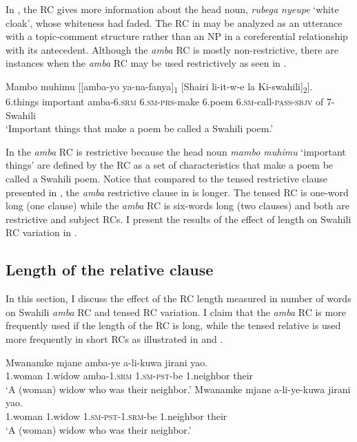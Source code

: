 \documentclass[output=paper,colorlinks,citecolor=brown]{langscibook}
\begin{document}
In , the RC gives more information about the head noun, \textit{rubega nyeupe} ‘white cloak’, whose whiteness had faded. The RC in  may be analyzed as an utterance with a topic-comment structure rather than an NP in a coreferential relationship with its antecedent. Although the \textit{amba} RC is mostly non-restrictive, there are instances when the \textit{amba} RC may be used restrictively as seen in .

\ea%
    \label{ex:mwamzandi:18}
    \gll    Mambo muhimu [[amba-yo  ya-na-fanya]\textsubscript{1} [Shairi li-it-w-e la Ki-swahili]\textsubscript{2}].\\
            6.things important amba\textsc{-6.srm} \textsc{6.sm-prs-}make 6.poem  \textsc{6.sm-}call\textsc{-pass-sbjv} of 7-Swahili\\
    \glt    ‘Important things that make a poem be called a Swahili poem.’
\z

In  the \textit{amba} RC is restrictive because the head noun \textit{mambo muhimu} ‘important things’ are defined by the RC as a set of characteristics that make a poem be called a Swahili poem. Notice that compared to the tensed restrictive clause presented in , the \textit{amba} restrictive clause in  is longer. The tensed RC is one-word long (one clause) while the \textit{amba} RC is six-words long (two clauses) and both are restrictive and subject RCs. I present the results of the effect of length on Swahili RC variation in .

\subsection{Length of the relative clause}\label{sec:mwamzandi:4.2}

In this section, I discuss the effect of the RC length measured in number of words on Swahili \textit{amba} RC and tensed RC variation. I claim that the \textit{amba} RC is more frequently used if the length of the RC is long, while the tensed relative is used more frequently in short RCs as illustrated in  and .

\ea%
    \label{ex:mwamzandi:19}
    \ea%
    \label{ex:mwamzandi:19a}
    \gll    Mwanamke mjane amba-ye a-li-kuwa jirani yao.\\
            1.woman 1.widow amba\textsc{-1.srm} \textsc{1.sm-pst-}be 1.neighbor their\\
    \glt    ‘A (woman) widow who was their neighbor.’
    \ex%
    \label{ex:mwamzandi:19b}
    \gll    Mwanamke mjane a-li-ye-kuwa jirani yao.\\
            1.woman  1.widow  \textsc{1.sm-pst-1.srm-}be 1.neighbor their\\
    \glt    ‘A (woman) widow who was their neighbor.’
    \z
\z
\end{document}
